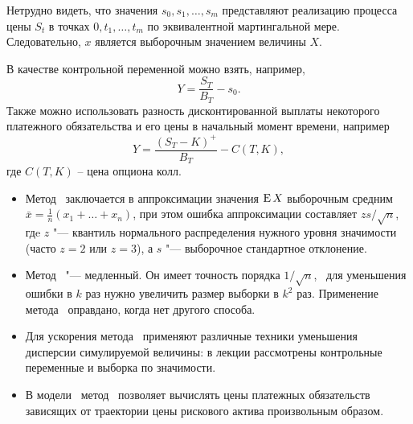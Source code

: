 Нетрудно видеть, что значения $s_0,s_1,\dots,s_m$ представляют реализацию процесса цены $S_t$ в точках $0,t_1,\dots,t_m$ по эквивалентной мартингальной мере.
Следовательно, $x$ является выборочным значением величины $X$.

В качестве контрольной переменной можно взять, например,
\[
Y = \frac{S_T}{B_T} - s_0. 
\]
Также можно использовать разность дисконтированной выплаты некоторого платежного обязательства и его цены в начальный момент времени, например
\[
Y = \frac{(S_T-K)^+}{B_T} - C(T,K),
\]
где $C(T,K)$ -- цена опциона колл.


\summary

\begin{itemize}
\item Метод \mc\ заключается в аппроксимации значения $\operatorname{E} X$ выборочным средним $\bar x = \frac1n (x_1+\ldots + x_n)$, при этом ошибка аппроксимации составляет $zs/\sqrt{n}$, гдe $z$ "--- квантиль нормального распределения нужного уровня значимости (часто $z=2$ или $z=3$), а $s$ "--- выборочное стандартное отклонение.

\item Метод \mc\ "--- медленный. Он имеет точность порядка $1/\sqrt{n}$, \te\ для уменьшения ошибки в $k$ раз нужно увеличить размер выборки в $k^2$ раз.
Применение метода \mc\ оправдано, когда нет другого способа.

\item Для ускорения метода \mc\ применяют различные техники уменьшения дисперсии симулируемой величины: в лекции рассмотрены контрольные переменные и выборка по значимости.

\item В модели \bs\ метод \mc\ позволяет вычислять цены платежных обязательств зависящих от траектории цены рискового актива произвольным образом.
\end{itemize}
